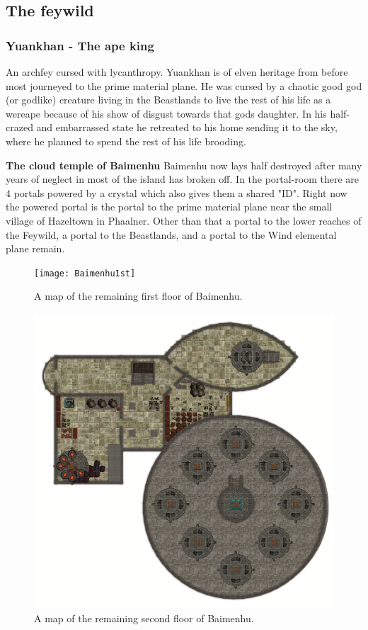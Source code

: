 \documentclass[a4paper]{article}
\begin{document}
\subsection{The feywild}

\subsubsection{Yuankhan - The ape king}
An archfey cursed with lycanthropy. Yuankhan is of elven heritage from before most journeyed to the prime material plane. He was cursed by a chaotic good god (or godlike) creature living in the Beastlands to live the rest of his life as a wereape because of his show of disgust towards that gods daughter. In his half-crazed and embarrassed state he retreated to his home sending it to the sky, where he planned to spend the rest of his life brooding. 

\textbf{The cloud temple of Baimenhu}
Baimenhu now lays half destroyed after many years of neglect in most of the island has broken off. In the portal-room there are 4 portals powered by a crystal which also gives them a shared "ID". Right now the powered portal is the portal to the prime material plane near the small village of Hazeltown in Phaalner. Other than that a portal to the lower reaches of the Feywild, a portal to the Beastlands, and a portal to the Wind elemental plane remain.

\begin{figure}[h]
\begin{center}
\texttt{[image: Baimenhu1st]}
\caption{A map of the remaining first floor of Baimenhu.}\label{Baimenhu1st}
\end{center}
\end{figure}

\begin{figure}[h]
\begin{center}
\includegraphics[scale=0.2]{Baimenhu2nd}
\caption{A map of the remaining second floor of Baimenhu.}\label{Baimenhu2nd}
\end{center}
\end{figure}
\end{document}
